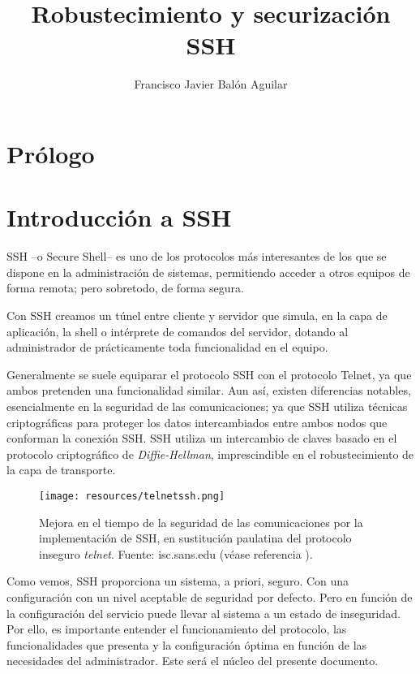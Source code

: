 \documentclass[a4paper, 11pt, titlepage]{article}
\title{Robustecimiento y securización SSH}
\author{Francisco Javier Balón Aguilar}
\begin{document}
\maketitle
\renewcommand{\contentsname}{Índice}
\tableofcontents
\newpage

\section*{Prólogo}
\newpage

\section{Introducción a SSH}

    SSH --o Secure Shell-- es uno de los protocolos más interesantes de los que se dispone 
    en la administración de sistemas, permitiendo acceder a otros equipos de forma remota; 
    pero sobretodo, de forma segura.
    
    Con SSH creamos un túnel entre cliente y servidor que simula, en la capa de aplicación, 
    la shell o intérprete de comandos del servidor, dotando al administrador de prácticamente 
    toda funcionalidad en el equipo.

    Generalmente se suele equiparar el protocolo SSH con el protocolo Telnet, ya que ambos 
    pretenden una funcionalidad similar. Aun así, existen diferencias notables, esencialmente 
    en la seguridad de las comunicaciones; ya que SSH utiliza técnicas criptográficas para 
    proteger los datos intercambiados entre ambos nodos que conforman la conexión SSH. SSH 
    utiliza un intercambio de claves basado en el protocolo criptográfico de \textit{Diffie-Hellman}, 
    imprescindible en el robustecimiento de la capa de transporte.

    \begin{figure}[htp]
        \centering
        \texttt{[image: resources/telnetssh.png]}
        \caption{Mejora en el tiempo de la seguridad de las comunicaciones por la implementación 
        de SSH, en sustitución paulatina del protocolo inseguro \textit{telnet}. Fuente: isc.sans.edu
        (véase referencia \cite{st}).}
        \label{telnetssh}
    \end{figure}


    Como vemos, SSH proporciona un sistema, a priori, seguro. Con una configuración con un 
    nivel aceptable de seguridad por defecto. Pero en función de la configuración del 
    servicio puede llevar al sistema a un estado de inseguridad. Por ello, es importante 
    entender el funcionamiento del protocolo, las funcionalidades que presenta y la configuración
    óptima en función de las necesidades del administrador. Este será el núcleo del presente 
    documento.
\end{document}
